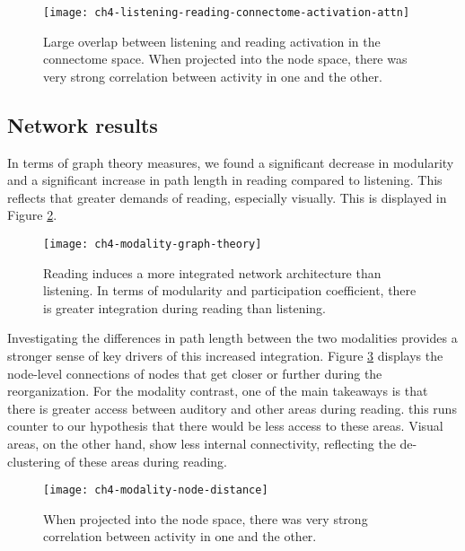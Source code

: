 \begin{figure}[t]
	\centering
	\texttt{[image: ch4-listening-reading-connectome-activation-attn]}
    \caption[Large overlap between listening and reading activation in the connectome space.]{Large overlap between listening and reading activation in the connectome space. When projected into the node space, there was very strong correlation between activity in one and the other.}
	\label{fig:ch4-listening-reading-connectome-activation-attn}
\end{figure}

\subsection{Network results}

In terms of graph theory measures, we found a significant decrease in modularity and a significant increase in path length in reading compared to listening. This reflects that greater demands of reading, especially visually. This is displayed in Figure \ref{fig:ch4-modality-graph-theory}.

\begin{figure}[t]
	\centering
	\texttt{[image: ch4-modality-graph-theory]}
    \caption[Reading induces a more integrated network architecture than listening.]{Reading induces a more integrated network architecture than listening. In terms of modularity and participation coefficient, there is greater integration during reading than listening. }
	\label{fig:ch4-modality-graph-theory}
\end{figure}

Investigating the differences in path length between the two modalities provides a stronger sense of key drivers of this increased integration. Figure \ref{fig:ch4-modality-node-distance} displays the node-level connections of nodes that get closer or further during the reorganization. For the modality contrast, one of the main takeaways is that there is greater access between auditory and other areas during reading. this runs counter to our hypothesis that there would be less access to these areas. Visual areas, on the other hand, show less internal connectivity, reflecting the de-clustering of these areas during reading. 

\begin{figure}[t]
	\centering
	\texttt{[image: ch4-modality-node-distance]}
    \caption[Large overlap between listening and reading activation in the connectome space.]{When projected into the node space, there was very strong correlation between activity in one and the other.}
	\label{fig:ch4-modality-node-distance}
\end{figure}



